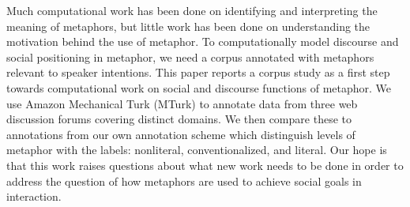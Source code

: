Much computational work has been done on identifying and interpreting the meaning of metaphors, but little work has been done on understanding the motivation behind the use of metaphor. To computationally model discourse and social positioning in metaphor, we need a corpus annotated with metaphors relevant to speaker intentions. This paper reports a corpus study as a first step towards computational work on social and discourse functions of metaphor. We use Amazon Mechanical Turk (MTurk) to annotate data from three web discussion forums covering distinct domains. We then compare these to annotations from our own annotation scheme which distinguish levels of metaphor with the labels: nonliteral, conventionalized, and literal. Our hope is that this work raises questions about what new work needs to be done in order to address the question of how metaphors are used to achieve social goals in interaction.
